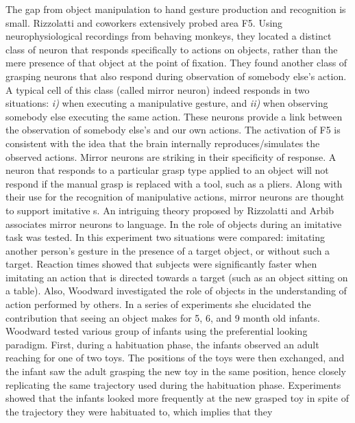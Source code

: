 The gap from object manipulation to hand gesture production and 
recognition is small.
Rizzolatti and coworkers \cite{gallese-fadiga-fogassi-rizzolatti-1996}
extensively probed area F5. 
\ifrevised
Using neurophysiological recordings from behaving monkeys,
they located a distinct class of neuron that responds specifically to
actions on objects, rather than the mere presence of that object at the
point of fixation.
\else
They found another class of grasping
neurons that also respond during observation of somebody else's action.
\fi
A typical cell of this class (called mirror neuron) indeed responds in two
situations: {\it i)} when executing a manipulative gesture, and {\it
ii)} when observing somebody else executing the same action. These
neurons provide a link between the observation of somebody else's
and our own actions. The activation of F5 is consistent with the idea
that the brain internally reproduces/simulates the observed actions.
\ifrevised
Mirror neurons are striking in their specificity of response.
A neuron that responds to a particular grasp type applied to an
object will not respond if the manual grasp is replaced with
a tool, such as a pliers.
\fi
Along with their use for the recognition of manipulative actions, mirror neurons are 
thought to support imitative \ahhbehavior{}s. An intriguing theory
proposed by Rizzolatti and Arbib \cite{rizzolatti98language}
associates mirror neurons to language.
%
In \cite{wohlsclager02human} the role of objects during an imitative 
task was tested. 
%
\ifrevised
%
In this experiment two situations were compared: imitating another
person's gesture in the presence of a target object, or without such a
target.  Reaction times showed that subjects were significantly faster
when imitating an action that is directed towards a target (such as an
object sitting on a table).
%
%
\fi
Also, Woodward \cite{woodward98infants} investigated the role 
of objects in the understanding of action performed by others. In a series 
of experiments she elucidated the contribution that seeing an object 
makes for 5, 6, and 9 month old infants. 
%
\ifrevised
%
Woodward tested various group of infants using the preferential
looking paradigm. First, during a habituation phase, the infants
observed an adult reaching for one of two toys.  The positions of the
toys were then exchanged, and the infant saw the adult grasping the
new toy in the same position, hence closely replicating the same
trajectory used during the habituation phase.  Experiments showed that
the infants looked more frequently at the new grasped toy in spite of
the trajectory they were habituated to, which implies that they
